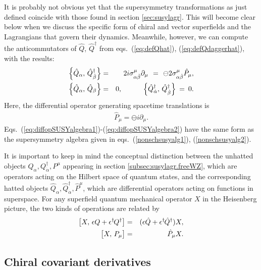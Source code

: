 \documentclass[12pt]{article}
\def\BDpos{}
\def\BDpos{-}
\def\BDpos{\oplus}
\def\BDpos{\ominus}
\def\beq{\begin{eqnarray}}
\def\eeq{\end{eqnarray}}
\begin{document}
It is probably not obvious yet that the supersymmetry transformations as 
just defined coincide with those found in section \ref{sec:susylagr}. 
This will become clear below when we discuss the specific form of chiral 
and vector superfields and the Lagrangians that govern their dynamics. 
Meanwhile, however, we can compute the anticommutators of $\hat Q$, $\hat 
Q^\dagger$ from eqs.~(\ref{eq:defQhat}), (\ref{eq:defQdaggerhat}), with 
the results:
\beq
\Bigl \lbrace \hat Q_\alpha,\, \hat Q^\dagger_{\dot\beta} \Bigr \rbrace
&=& 
2 i \sigma^\mu_{\alpha\dot\beta}\partial_\mu
\>\,=\,\> \BDpos 2 \sigma^\mu_{\alpha\dot\beta} \hat P_\mu,
\label{eq:diffopSUSYalgebra1}
\\
\Bigl \lbrace \hat Q_\alpha,\, \hat Q_{\beta} \Bigr \rbrace &=& 0,\qquad\quad
\Bigl \lbrace \hat Q^\dagger_{\dot \alpha},\, \hat Q^\dagger_{\dot\beta} 
\Bigr \rbrace \>=\> 0.
\label{eq:diffopSUSYalgebra2}
\eeq
Here, the differential operator generating spacetime translations is   
\beq
\hat P_\mu = \BDpos i \partial_\mu.
\eeq
Eqs.~(\ref{eq:diffopSUSYalgebra1})-(\ref{eq:diffopSUSYalgebra2}) have the same 
form as the supersymmetry algebra given in 
eqs.~(\ref{nonschsusyalg1}), (\ref{nonschsusyalg2}). 

It is important to keep in 
mind the conceptual distinction between the unhatted objects 
$Q_\alpha, Q^\dagger_{\dot\alpha}, 
P^\mu$ appearing in section \ref{subsec:susylagr.freeWZ}, 
which are operators acting on the Hilbert space of quantum states,
and the corresponding hatted objects 
$\hat Q_\alpha, \hat Q^\dagger_{\dot\alpha},
\hat P^\mu$, which are differential operators acting on functions in 
superspace. For any superfield
quantum mechanical operator $X$ in the Heisenberg picture, 
the two kinds of operations are related by 
\beq
\bigl [X,\, \epsilon Q + \epsilon^\dagger\hspace{-1pt} Q^\dagger \bigr ]
&=&
(\epsilon \hat Q + \epsilon^\dagger\hspace{-1pt} \hat Q^\dagger) X ,
\\
\bigl [X ,\, P_\mu \bigr ] &=& \hat P_\mu X.
\eeq

\subsection{Chiral covariant derivatives\label{subsec:supercovariantderivatives}}
\setcounter{equation}{0}
\setcounter{footnote}{2}
\end{document}
